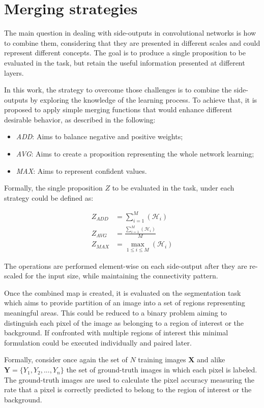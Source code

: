 \section{Merging strategies}

The main question in dealing with side-outputs in convolutional networks is how to combine them, considering that they are presented in different scales and could represent different concepts. The goal is to produce a single proposition to be evaluated in the task, but retain the useful information presented at different layers.

In this work, the strategy to overcome those challenges is to combine the side-outputs by exploring the knowledge of the learning process. To achieve that, it is proposed to apply simple merging functions that would enhance different desirable behavior, as described in the following: 
\begin{itemize}
\item \textit{ADD}: Aims to balance negative and positive weights;
\item \textit{AVG}: Aims to create a proposition representing the whole network learning;  
\item \textit{MAX}: Aims to represent confident values. 
\end{itemize}  

Formally, the single proposition $Z$ to be evaluated in the task, under each strategy could be defined as:

\begin{align}
Z_{ADD} &= \sum_{i=1}^{M}(\mathcal{H}_i)\\
Z_{AVG} &= \frac{\sum_{i=1}^{M}(\mathcal{H}_i)}{M}\\
Z_{MAX} &= \max_{1 \leq i \leq M} (\mathcal{H}_i)
\end{align} 

The operations are performed element-wise on each side-output after they are re-scaled for the input size, while maintaining the connectivity pattern. 

Once the combined map is created, it is evaluated on the segmentation task which aims to provide partition of an image into a set of regions representing meaningful areas. This could be reduced to a binary problem aiming to distinguish each pixel of the image as belonging to a region of interest or the background. If confronted with multiple regions of interest this minimal formulation could be executed individually and paired later.


Formally, consider once again the set of $N$ training images $\mathbf{X}$ and alike $\mathbf{Y}=\{Y_1, Y_2,...,Y_n\}$ the set of ground-truth images in which each pixel is labeled.  The ground-truth images are used to calculate the pixel accuracy measuring the rate that a pixel is correctly predicted to belong to the region of interest or the background.


